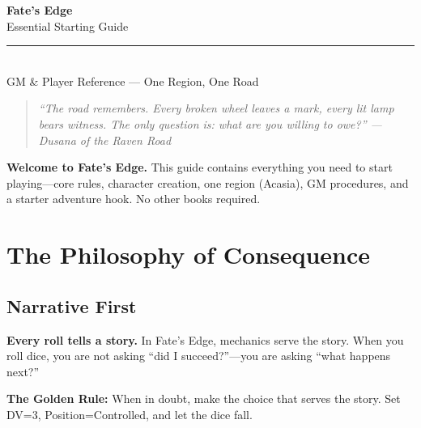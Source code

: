 \documentclass[10pt,twocolumn]{article} %
\begin{document}



\begin{center}
    {\Huge\bfseries\sffamily\color{edgered} Fate's Edge}\\[0.2em]
    {\large\sffamily Essential Starting Guide}\\[0.5em]
    \rule{0.7\textwidth}{0.5pt}\\[0.8em]
    {\large\sffamily GM \& Player Reference --- One Region, One Road}\\[1em]
    \begin{quote}
        \itshape ``The road remembers. Every broken wheel leaves a mark, every lit lamp bears witness. The only question is: what are you willing to owe?''
        \hfill --- Dusana of the Raven Road
    \end{quote}
    \begin{sidebar}
        \textbf{Welcome to Fate's Edge.} This guide contains everything you need to start playing---core rules, character creation, one region (Acasia), GM procedures, and a starter adventure hook. No other books required.
    \end{sidebar}
\end{center}
\vspace{1em}

\section{The Philosophy of Consequence}

\subsection{Narrative First}
\textbf{Every roll tells a story.} In Fate's Edge, mechanics serve the story. When you roll dice, you are not asking ``did I succeed?''---you are asking ``what happens next?''

\begin{sidebar}
    \textbf{The Golden Rule:} When in doubt, make the choice that serves the story. Set DV=3, Position=Controlled, and let the dice fall.
\end{sidebar}
\end{document}
